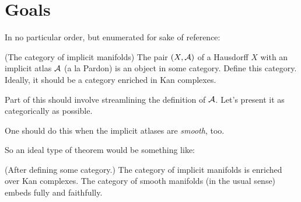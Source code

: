  

\section{Goals}
In no particular order, but enumerated for sake of reference:
\enum
	\item (The category of implicit manifolds)
		The pair $(X, \mathcal A)$ of a Hausdorff $X$ with an implicit atlas $\mathcal A$ (a la Pardon) is an object in some category. Define this category. Ideally, it should be a category enriched in Kan complexes.
			\enum
				\item
					Part of this should involve streamlining the definition of $\mathcal A$. Let's present it as categorically as possible.
				\item
					One should do this when the implicit atlases are {\em smooth}, too.
				\item
					So an ideal type of theorem would be something like:
						\begin{theorem}
						(After defining some category.) The category of implicit manifolds is enriched over Kan complexes. The category of smooth manifolds (in the usual sense) embeds fully and faithfully.
						\end{theorem}
				\item {}
				\item
				

